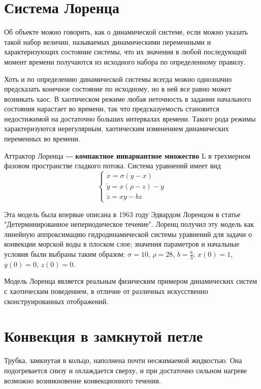 \documentclass[12pt]{article}
\begin{document}

\newpage

\section{Система Лоренца}
Об объекте можно говорить, как о динамической системе, если можно указать такой набор величин, называемых динамическими переменными и характеризующих состояние системы, что их значения в любой последующий момент времени получаются из исходного набора по определенному правилу.

Хоть и по определению динамической системы всегда можно однозначно предсказать конечное состояние по исходному, но в ней все равно может возникать хаос. В хаотическом режиме любая неточность в задании начального состояния нарастает во времени, так что предсказуемость становится недостижимой на достаточно больших интервалах времени. Такого рода режимы характеризуются нерегулярным, хаотическим изменением динамических переменных во времени.

Аттрактор Лоренца ― \textbf{компактное инвариантное множество} L в трехмерном фазовом пространстве гладкого потока. Система уравнений имеет вид
$$\begin{cases}	
	\dot{x} = \sigma (y-x) \\
	\dot{y} = x(\rho-z)-y \\
	\dot{z} = xy-bz
\end{cases}$$

Эта модель была впервые описана в 1963 году Эдвардом Лоренцом в статье "Детерминированное непериодическое течение". Лоренц получил эту модель как линейную аппроксимацию гидродинамической системы уравнений для задачи о конвекции морской воды в плоском слое; значения параметров и начальные условия были выбраны таким образом: $\sigma = 10$, $\rho = 28$, $b = \frac{8}{3}$; $x(0) = 1$, $y(0) = 0$, $z(0) = 0$.

Модель Лоренца является реальным физическим примером динамических систем с хаотическим поведением, в отличие от различных искусственно сконструированных отображений.

\section{Конвекция в замкнутой петле}

Трубка, замкнутая в кольцо, наполнена почти несжимаемой жидкостью. Она подогревается снизу и охлаждается сверху, и при достаточно сильном нагреве возможно возникновение конвекционного течения.
\end{document}
